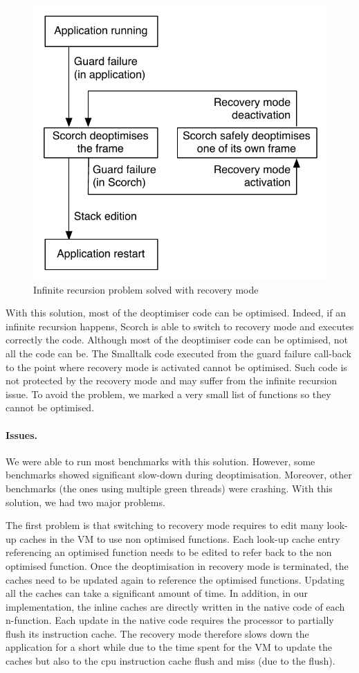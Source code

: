 \documentclass[a4paper,12pt,twoside]{../includes/ThesisStyle}
\begin{document}
\begin{figure}[h!]
    \begin{center}
        \includegraphics[width=0.6\linewidth]{InfiniteRecursionDeoptPbRecovery}
        \caption{Infinite recursion problem solved with recovery mode}
        \label{fig:InfiniteRecursionDeoptPbRecovery}
    \end{center}
\end{figure}

With this solution, most of the deoptimiser code can be optimised. Indeed, if an infinite recursion happens, Scorch is able to switch to recovery mode and executes correctly the code. Although most of the deoptimiser code can be optimised, not all the code can be. The Smalltalk code executed from the guard failure call-back to the point where recovery mode is activated cannot be optimised. Such code is not protected by the recovery mode and may suffer from the infinite recursion issue. To avoid the problem, we marked a very small list of functions so they cannot be optimised.

\paragraph{Issues.} We were able to run most benchmarks with this solution. However, some benchmarks showed significant slow-down during deoptimisation. Moreover, other benchmarks (the ones using multiple green threads) were crashing. With this solution, we had two major problems. 

The first problem is that switching to recovery mode requires to edit many look-up caches in the VM to use non optimised functions. Each look-up cache entry referencing an optimised function needs to be edited to refer back to the non optimised function. Once the deoptimisation in recovery mode is terminated, the caches need to be updated again to reference the optimised functions. Updating all the caches can take a significant amount of time. In addition, in our implementation, the inline caches are directly written in the native code of each n-function. Each update in the native code requires the processor to partially flush its instruction cache. The recovery mode therefore slows down the application for a short while due to the time spent for the VM to update the caches but also to the cpu instruction cache flush and miss (due to the flush).
\end{document}
